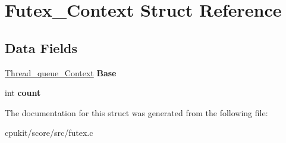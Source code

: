 \hypertarget{structFutex__Context}{}\section{Futex\+\_\+\+Context Struct Reference}
\label{structFutex__Context}
\subsection*{Data Fields}
\begin{DoxyCompactItemize}
\item 
\mbox{\label{structFutex__Context_a096fe289b19af4a11f8d9ad38ca4477c}} 
\mbox{\hyperlink{structThread__queue__Context}{Thread\+\_\+queue\+\_\+\+Context}} {\bfseries Base}
\item 
\mbox{\label{structFutex__Context_a5b0459f6dac62574b6b8fbb20870710b}} 
int {\bfseries count}
\end{DoxyCompactItemize}


The documentation for this struct was generated from the following file\+:\begin{DoxyCompactItemize}
\item 
cpukit/score/src/futex.\+c\end{DoxyCompactItemize}

